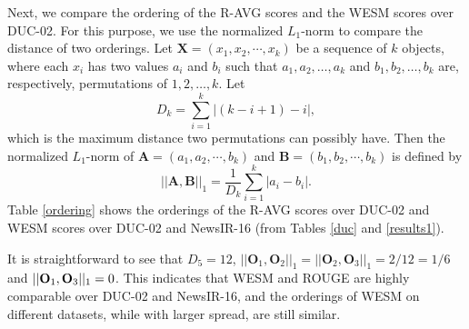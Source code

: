 \documentclass[a4paper,twoside]{article}
\begin{document}
Next, we compare the ordering of the R-AVG scores and the WESM scores over DUC-02. For this purpose, we use the normalized $L_1$-norm to compare the distance of two orderings. Let ${\bm X} = (x_1, x_2, \cdots, x_k)$ be a sequence of $k$ objects, where
each $x_i$ has two values $a_i$ and $b_i$ such that
$a_1, a_2, \ldots, a_k$ and $b_1,b_2,\ldots, b_k$ are, respectively, permutations of $1,2,\ldots,k$.
Let
\[
D_k= \sum_{i=1}^k |(k-i+1)-i|,
\]
which is the maximum distance two permutations can possibly have. Then
the normalized $L_1$-norm of ${\bm A} = (a_1, a_2, \cdots, b_k)$ and ${\bm B} = (b_1, b_2, \cdots, b_k)$ is defined by
$$||{\bm A}, {\bm B}||_1 = \frac{1}{D_k}\sum_{i=1}^k |a_i - b_i|.$$
Table \ref{ordering} shows the orderings of the R-AVG scores over DUC-02 and WESM scores over DUC-02 and NewsIR-16 (from Tables \ref{duc} and \ref{results1}).

It is straightforward to see that $D_5 = 12$,
$||{\bm O}_1, {\bm O}_2||_1 = ||{\bm O}_2, {\bm O}_3||_1 = 2/12 = 1/6$ and $||{\bf O}_1,{\bf O}_3||_1 = 0$.
This indicates that WESM and ROUGE are highly comparable over DUC-02 and NewsIR-16,
and the orderings of WESM on different datasets, while with larger spread, are
still similar.
\end{document}
